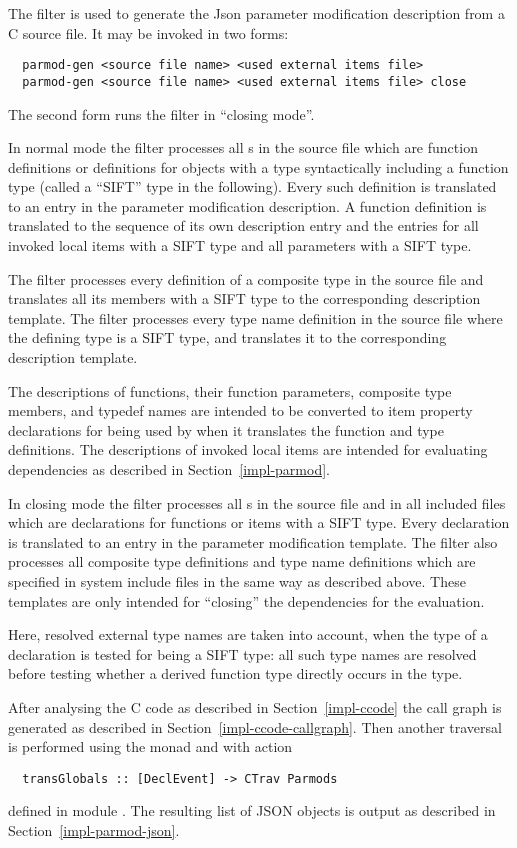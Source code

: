 The filter  is used to generate the Json parameter modification description from a C source file.
It may be invoked in two forms:
\begin{verbatim}
  parmod-gen <source file name> <used external items file>
  parmod-gen <source file name> <used external items file> close
\end{verbatim}
The second form runs the filter in ``closing mode''.

In normal mode the filter processes all s in the source file which are function
definitions or definitions for objects with a type syntactically including a function type (called a ``SIFT'' 
type in the following). Every such definition is translated to an
entry in the parameter modification description. A function definition is translated to the sequence of its
own description entry and the entries for all invoked local items with a SIFT type and all parameters with 
a SIFT type.

The filter processes every definition of a composite type in the source file and translates all
its members with a SIFT type to the corresponding
description template. The filter processes every type name definition in the source file where the defining type
is a SIFT type, and translates it to the corresponding description template.

The descriptions of functions, their function parameters, composite type members, and typedef names are 
intended to be converted to item property declarations for being used by 
when it translates the function and type definitions. The descriptions of invoked local items 
are intended for evaluating dependencies as described in Section~\ref{impl-parmod}.

In closing mode the filter processes all s in the source file and in all included files which
are declarations for functions or items with a SIFT type. Every declaration is translated to an entry in the parameter
modification template. The filter also processes all composite type definitions and type name definitions which
are specified in system include files in the same way as described above. 
These templates are only intended for ``closing'' the dependencies for the evaluation.

Here, resolved external type names are taken into account, when the type of a declaration is tested for 
being a SIFT type: all such type names are resolved before testing whether a derived function type directly
occurs in the type.

After analysing the C code as described in Section~\ref{impl-ccode} the call graph is generated as described
in Section~\ref{impl-ccode-callgraph}. Then another traversal is performed using the  monad and
 with action
\begin{verbatim}
  transGlobals :: [DeclEvent] -> CTrav Parmods
\end{verbatim}
defined in module . The resulting list of JSON objects is output as described 
in Section~\ref{impl-parmod-json}.

